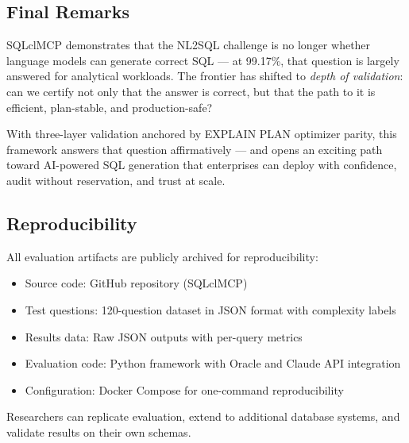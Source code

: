 \subsection{Final Remarks}

SQLclMCP demonstrates that the NL2SQL challenge is no longer whether language models can generate correct SQL — at 99.17\%, that question is largely answered for analytical workloads. The frontier has shifted to \emph{depth of validation}: can we certify not only that the answer is correct, but that the path to it is efficient, plan-stable, and production-safe?

With three-layer validation anchored by EXPLAIN PLAN optimizer parity, this framework answers that question affirmatively — and opens an exciting path toward AI-powered SQL generation that enterprises can deploy with confidence, audit without reservation, and trust at scale.

\subsection{Reproducibility}

All evaluation artifacts are publicly archived for reproducibility:
\begin{itemize}
    \item Source code: GitHub repository (SQLclMCP)
    \item Test questions: 120-question dataset in JSON format with complexity labels
    \item Results data: Raw JSON outputs with per-query metrics
    \item Evaluation code: Python framework with Oracle and Claude API integration
    \item Configuration: Docker Compose for one-command reproducibility
\end{itemize}

Researchers can replicate evaluation, extend to additional database systems, and validate results on their own schemas.
